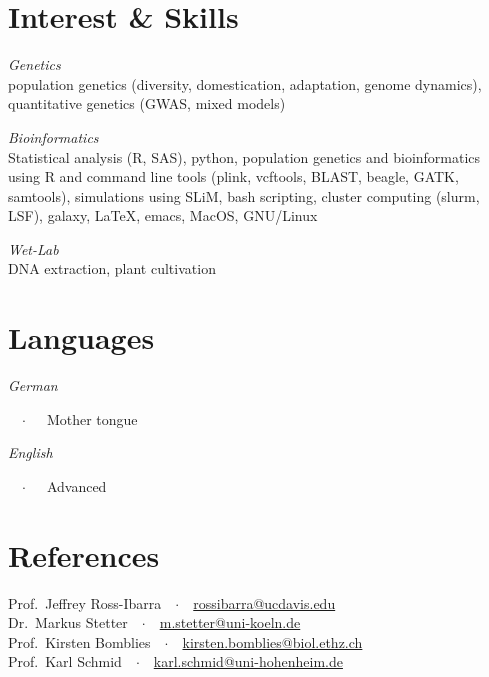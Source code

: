\documentclass[margin]{res}
\begin{document}
\begin{resume}
\section{Interest \& Skills } 

{\sl{Genetics}}\\
population genetics (diversity, domestication, adaptation, genome dynamics), quantitative genetics (GWAS, mixed models)
 
{\sl{Bioinformatics}}\\
Statistical analysis (\textsf{R}, \textsc{SAS}), python, population genetics and bioinformatics using \textsf{R} and command line tools (plink, vcftools, BLAST, beagle, GATK, samtools), simulations using SLiM, bash scripting, cluster computing (slurm, LSF), galaxy, \LaTeX, emacs, MacOS, GNU/Linux

{\sl{Wet-Lab}}\\
DNA extraction, plant cultivation


\section{Languages}
\newlength{\langbox} 
\settowidth{\langbox}{Germang}
\parbox[t]{\langbox}{\sl{German}}\ \ $\cdotp$\ \ \ Mother tongue\\
\parbox[t]{\langbox}{\sl{English}}\ \ $\cdotp$\ \ \ Advanced


\section{References}

Prof.~Jeffrey Ross-Ibarra\ \ $\cdotp$\ \ \href{mailto:rossibarra@ucdavis.edu}{rossibarra@ucdavis.edu}\\
Dr.~Markus Stetter\ \ $\cdotp$\ \ \href{mailto:m.stetter@uni-koeln.de}{m.stetter@uni-koeln.de}\\
Prof.~Kirsten Bomblies\ \ $\cdotp$\ \ \href{mailto:kirsten.bomblies@biol.ethz.ch}{kirsten.bomblies@biol.ethz.ch}\\
Prof.~Karl Schmid\ \ $\cdotp$\ \ \href{mailto:karl.schmid@uni-hohenheim.de}{karl.schmid@uni-hohenheim.de}\\



\end{resume}
\end{document}
